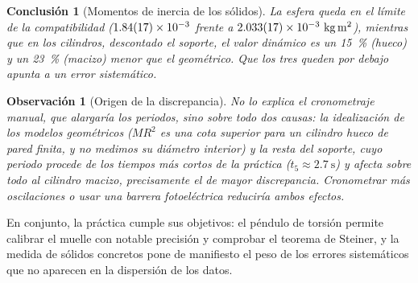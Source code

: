 \documentclass[a4paper,11pt]{amsart}
\numberwithin{equation}{section}
\theoremstyle{cienplano}
\newtheorem{conclusion}[proposicion]{Conclusión}
\theoremstyle{ciendef}
\theoremstyle{cienobs}
\newtheorem{observacion}[proposicion]{Observación}
\begin{document}
\begin{conclusion}[Momentos de inercia de los sólidos]\label{conc:solidos}
La esfera queda en el límite de la compatibilidad
($\num{1,84 \pm 0,17 e-3}$ frente a
$\num{2,033 \pm 0,017 e-3}\ \si{\kilogram\meter\squared}$), mientras que en
los cilindros, descontado el soporte, el valor dinámico es un
\SI{15}{\percent} (hueco) y un \SI{23}{\percent} (macizo) menor que el
geométrico. Que los tres queden por debajo apunta a un error sistemático.
\end{conclusion}

\begin{observacion}[Origen de la discrepancia]\label{obs:sistematico}
No lo explica el cronometraje manual, que alargaría los periodos, sino
sobre todo dos causas: la idealización de los modelos geométricos ($MR^{2}$
es una cota superior para un cilindro hueco de pared finita, y no medimos su
diámetro interior) y la resta del soporte, cuyo periodo procede de los
tiempos más cortos de la práctica ($t_{5}\approx\SI{2,7}{\second}$) y afecta
sobre todo al cilindro macizo, precisamente el de mayor discrepancia.
Cronometrar más oscilaciones o usar una barrera fotoeléctrica reduciría
ambos efectos.
\end{observacion}

En conjunto, la práctica cumple sus objetivos: el péndulo de torsión permite
calibrar el muelle con notable precisión y comprobar el teorema de Steiner, y
la medida de sólidos concretos pone de manifiesto el peso de los errores
sistemáticos que no aparecen en la dispersión de los datos.

\newpage
\printbibliography[title={Referencias}]
\end{document}
